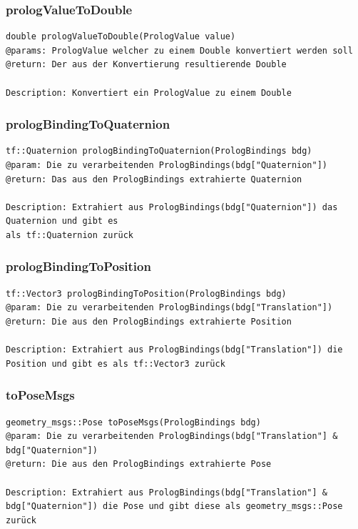 \documentclass{suturo}
\begin{document}
\subsubsection{prologValueToDouble}
\begin{verbatim}
double prologValueToDouble(PrologValue value)
@params: PrologValue welcher zu einem Double konvertiert werden soll
@return: Der aus der Konvertierung resultierende Double 

Description: Konvertiert ein PrologValue zu einem Double
\end{verbatim}\label{func:findcluster}

\subsubsection{prologBindingToQuaternion}
\begin{verbatim}
tf::Quaternion prologBindingToQuaternion(PrologBindings bdg)
@param: Die zu verarbeitenden PrologBindings(bdg["Quaternion"])
@return: Das aus den PrologBindings extrahierte Quaternion

Description: Extrahiert aus PrologBindings(bdg["Quaternion"]) das Quaternion und gibt es
als tf::Quaternion zurück
\end{verbatim}\label{func:findcentergazebo}


\subsubsection{prologBindingToPosition}
\begin{verbatim}
tf::Vector3 prologBindingToPosition(PrologBindings bdg)
@param: Die zu verarbeitenden PrologBindings(bdg["Translation"])
@return: Die aus den PrologBindings extrahierte Position

Description: Extrahiert aus PrologBindings(bdg["Translation"]) die Position und gibt es als tf::Vector3 zurück
\end{verbatim}\label{func:findcenter}

\subsubsection{toPoseMsgs}
\begin{verbatim}
geometry_msgs::Pose toPoseMsgs(PrologBindings bdg)
@param: Die zu verarbeitenden PrologBindings(bdg["Translation"] & bdg["Quaternion"])
@return: Die aus den PrologBindings extrahierte Pose

Description: Extrahiert aus PrologBindings(bdg["Translation"] & bdg["Quaternion"]) die Pose und gibt diese als geometry_msgs::Pose zurück
\end{verbatim}\label{func:estimatesurfacenormals}
\end{document}
